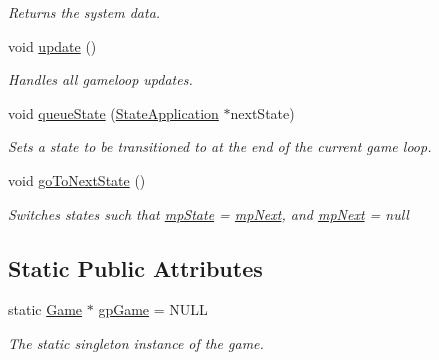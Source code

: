 \begin{DoxyCompactItemize}
\begin{DoxyCompactList}\small\item\em Returns the system data. \end{DoxyCompactList}\item 
void \hyperlink{class_game_a79df6376b332d63c9eca0dcee30305c3}{update} ()
\begin{DoxyCompactList}\small\item\em Handles all gameloop updates. \end{DoxyCompactList}\item 
\hypertarget{class_game_afe06acbc24125f9a7e9d94f7740315fb}{void \hyperlink{class_game_afe06acbc24125f9a7e9d94f7740315fb}{queue\-State} (\hyperlink{class_state_application}{State\-Application} $\ast$next\-State)}\label{class_game_afe06acbc24125f9a7e9d94f7740315fb}

\begin{DoxyCompactList}\small\item\em Sets a state to be transitioned to at the end of the current game loop. \end{DoxyCompactList}\item 
\hypertarget{class_game_afa29034b42f2825221ffea4fac919363}{void \hyperlink{class_game_afa29034b42f2825221ffea4fac919363}{go\-To\-Next\-State} ()}\label{class_game_afa29034b42f2825221ffea4fac919363}

\begin{DoxyCompactList}\small\item\em Switches states such that {\ttfamily \hyperlink{class_game_a1f85e8206f06c0bd64430effae32c577}{mp\-State} = \hyperlink{class_game_a247b4d7b1656218d90a8544cb674f0b3}{mp\-Next}}, and {\ttfamily \hyperlink{class_game_a247b4d7b1656218d90a8544cb674f0b3}{mp\-Next} = null} \end{DoxyCompactList}\end{DoxyCompactItemize}
\subsection*{Static Public Attributes}
\begin{DoxyCompactItemize}
\item 
\hypertarget{class_game_a9518d0c89b6d47d2e3042809bc9c5f6a}{static \hyperlink{class_game}{Game} $\ast$ \hyperlink{class_game_a9518d0c89b6d47d2e3042809bc9c5f6a}{gp\-Game} = N\-U\-L\-L}\label{class_game_a9518d0c89b6d47d2e3042809bc9c5f6a}

\begin{DoxyCompactList}\small\item\em The static singleton instance of the game. \end{DoxyCompactList}\end{DoxyCompactItemize}
